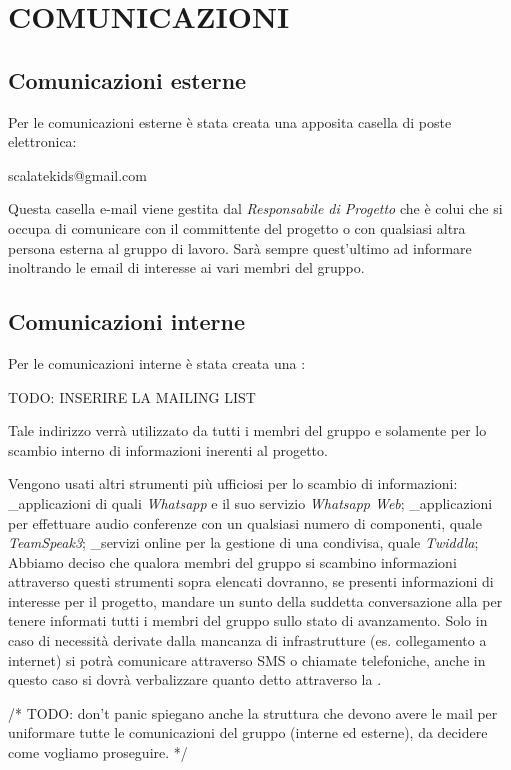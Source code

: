 \section{COMUNICAZIONI}
\subsection{Comunicazioni esterne}
Per le comunicazioni esterne è stata creata una apposita casella di poste elettronica: 
\begin{center}
scalatekids@gmail.com 	
\end{center}
Questa casella e-mail viene gestita dal \textit{Responsabile di Progetto} che è colui che si occupa di comunicare con il committente del progetto o con qualsiasi altra persona esterna al gruppo di lavoro. Sarà sempre quest'ultimo ad informare inoltrando le email di interesse ai vari membri del gruppo.

\subsection{Comunicazioni interne}
Per le comunicazioni interne è stata creata una :
\begin{center}
TODO: INSERIRE LA MAILING LIST 
\end{center}
Tale indirizzo verrà utilizzato da tutti i membri del gruppo e solamente per lo scambio interno di informazioni inerenti al progetto.

Vengono usati altri strumenti più ufficiosi per lo scambio di informazioni:
_applicazioni di  quali \textit{Whatsapp} e il suo servizio \textit{Whatsapp Web};
_applicazioni  per effettuare audio conferenze con un qualsiasi numero di componenti, quale \textit{TeamSpeak3};
_servizi online per la gestione di una  condivisa, quale \textit{Twiddla};
Abbiamo deciso che qualora membri del gruppo si scambino informazioni attraverso questi strumenti sopra elencati dovranno, se presenti informazioni di interesse per il progetto, mandare un sunto della suddetta conversazione alla  per tenere informati tutti i membri del gruppo sullo stato di avanzamento.
Solo in caso di necessità derivate dalla mancanza di infrastrutture (es. collegamento a internet) si potrà comunicare attraverso SMS o chiamate telefoniche, anche in questo caso si dovrà verbalizzare quanto detto attraverso la .

/*
	TODO: don't panic spiegano anche la struttura che devono avere le mail per uniformare tutte le comunicazioni del gruppo (interne ed esterne), da decidere come vogliamo proseguire.
*/
